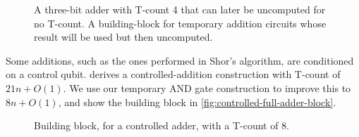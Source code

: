 \documentclass[twocolumn,longbibliography]{quantumarticle-customized}
\begin{document}
\begin{figure}
  \caption{
	  A three-bit adder with T-count 4 that can later be uncomputed for no T-count.
	  A building-block for temporary addition circuits whose result will be used but then uncomputed.
  }
  \label{fig:temporary-full-adder-block}
\end{figure}

Some additions, such as the ones performed in Shor's algorithm, are conditioned on a control qubit.
\cite{Coreas2017} derives a controlled-addition construction with T-count of $21n + O(1)$.
We use our temporary AND gate construction to improve this to $8n + O(1)$, and show the building block in \autoref{fig:controlled-full-adder-block}.

\begin{figure}
  \caption{
	Building block, for a controlled adder, with a T-count of 8.
  }
  \label{fig:controlled-full-adder-block}
\end{figure}
\end{document}
